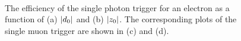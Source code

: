 \begin{figure}[!htp]
    \centering
     \\
    \caption{The efficiency of the single photon trigger for an electron as a function of (a) $|d_{0}|$ and (b) $|z_{0}|$. The corresponding plots of the single muon trigger are shown in (c) and (d).}
    \label{fig:signal_TrigEff}
\end{figure}



